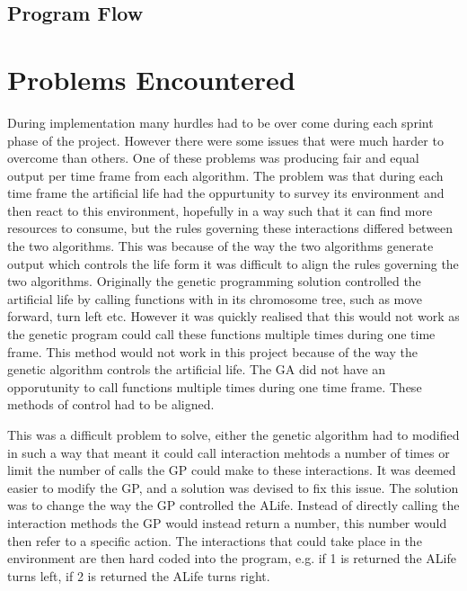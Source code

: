 \documentclass[12pt]{article}
\begin{document}
\subsection{Program Flow}

\section{Problems Encountered}

During implementation many hurdles had to be over come during each sprint phase of the project. However there were some issues that were much harder to overcome than others. One of these problems was
producing fair and equal output per time frame from each algorithm. The problem was that during each time frame the artificial life had the oppurtunity to survey its environment and then react to this
environment, hopefully in a way such that it can find more resources to consume, but the rules governing these interactions differed between the two algorithms.
This was because of the way the two algorithms generate output which controls the life form it was difficult to align
the rules governing the two algorithms. Originally the genetic programming solution controlled the artificial life by calling functions with in its chromosome tree, such as move forward, turn left etc.
However it was quickly realised that this would not work as the genetic program could call these functions multiple times during one time frame. This method would not work in this project because
of the way the genetic algorithm controls the artificial life. The GA did not have an opporutunity to call functions multiple times during one time frame. These methods of control had to be aligned. 

This was a difficult problem to solve, either the genetic algorithm had to modified in such a way that meant it could call interaction mehtods
a number of times or limit the number of calls the GP could make to these interactions. It was deemed easier to modify the GP, and a solution
was devised to fix this issue. The solution was to change the way the GP controlled the ALife. Instead of directly calling the interaction methods
the GP would instead return a number, this number would then refer to a specific action. The interactions that could take place in 
the environment are then hard coded into the program, e.g. if 1 is returned the ALife turns left, if 2 is returned the ALife turns right.
\end{document}
